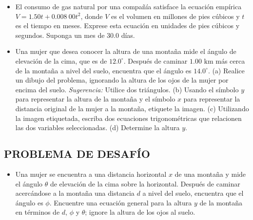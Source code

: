 \documentclass[11pt,a4paper]{article}
\begin{document}
\begin{itemize}
    \item[\textbf{37.}] El consumo de gas natural por una compañía satisface la ecuación empírica $V = 1.50t + 0.008\ 00t^2$, donde $V$ es el volumen en millones de pies cúbicos y $t$ es el tiempo en meses. Exprese esta ecuación en unidades de pies cúbicos y segundos. Suponga un mes de $30.0$ días.
    \vspace*{8cm}
    
    \item[\textbf{38.}] Una mujer que desea conocer la altura de una montaña mide el ángulo de elevación de la cima, que es de $12.0^\circ$. Después de caminar $1.00 \text{ km}$ más cerca de la montaña a nivel del suelo, encuentra que el ángulo es $14.0^\circ$. (a) Realice un dibujo del problema, ignorando la altura de los ojos de la mujer por encima del suelo. \textit{Sugerencia:} Utilice dos triángulos. (b) Usando el símbolo $y$ para representar la altura de la montaña y el símbolo $x$ para representar la distancia original de la mujer a la montaña, etiquete la imagen. (c) Utilizando la imagen etiquetada, escriba dos ecuaciones trigonométricas que relacionen las dos variables seleccionadas. (d) Determine la altura $y$.
    \vspace*{10cm}
\end{itemize}

\newpage

\subsection*{PROBLEMA DE DESAFÍO}

\begin{itemize}
    \item[\textbf{39.}] Una mujer se encuentra a una distancia horizontal $x$ de una montaña y mide el ángulo $\theta$ de elevación de la cima sobre la horizontal. Después de caminar acercándose a la montaña una distancia $d$ a nivel del suelo, encuentra que el ángulo es $\phi$. Encuentre una ecuación general para la altura $y$ de la montaña en términos de $d$, $\phi$ y $\theta$; ignore la altura de los ojos al suelo.
    \vspace*{10cm}
\end{itemize}
\end{document}
